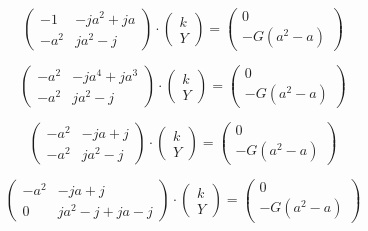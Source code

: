\documentclass{article}
\begin{document}
$$
    \begin{pmatrix}
        -1   & - j a^2 + j a \\
        -a^2 & j a^2 - j
    \end{pmatrix}
    \cdot
    \begin{pmatrix}
        k \\
        Y
    \end{pmatrix}
    =
    \begin{pmatrix}
        0 \\
        - G (a^2 - a)
    \end{pmatrix}
$$

$$
    \begin{pmatrix}
        -a^2 & - j a^4 + j a^3 \\
        -a^2 & j a^2 - j
    \end{pmatrix}
    \cdot
    \begin{pmatrix}
        k \\
        Y
    \end{pmatrix}
    =
    \begin{pmatrix}
        0 \\
        - G (a^2 - a)
    \end{pmatrix}
$$

$$
    \begin{pmatrix}
        -a^2 & - j a + j \\
        -a^2 & j a^2 - j
    \end{pmatrix}
    \cdot
    \begin{pmatrix}
        k \\
        Y
    \end{pmatrix}
    =
    \begin{pmatrix}
        0 \\
        - G (a^2 - a)
    \end{pmatrix}
$$

$$
    \begin{pmatrix}
        -a^2 & - j a + j           \\
        0    & j a^2 - j + j a - j
    \end{pmatrix}
    \cdot
    \begin{pmatrix}
        k \\
        Y
    \end{pmatrix}
    =
    \begin{pmatrix}
        0 \\
        - G (a^2 - a)
    \end{pmatrix}
$$
\end{document}
